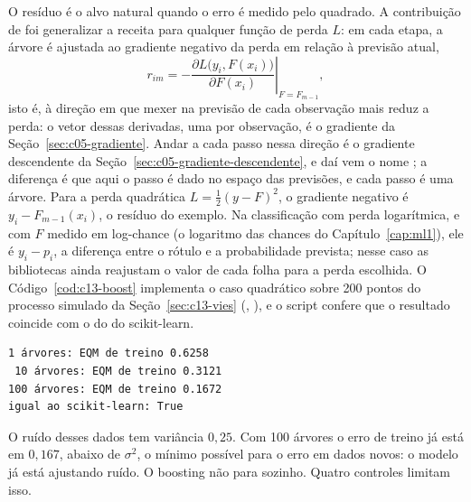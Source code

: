 O resíduo é o alvo natural quando o erro é medido pelo quadrado. A contribuição de \citet{friedman2001} foi generalizar a receita para qualquer função de perda $L$: em cada etapa, a árvore é ajustada ao gradiente negativo da perda em relação à previsão atual,
\begin{equation}
  r_{im} = -\left.\frac{\partial L\big(y_i, F(x_i)\big)}{\partial F(x_i)}\right|_{F = F_{m-1}} ,
\end{equation}
isto é, à direção em que mexer na previsão de cada observação mais reduz a perda: o vetor dessas derivadas, uma por observação, é o gradiente da Seção~\ref{sec:c05-gradiente}. Andar a cada passo nessa direção é o gradiente descendente da Seção~\ref{sec:c05-gradiente-descendente}, e daí vem o nome ; a diferença é que aqui o passo é dado no espaço das previsões, e cada passo é uma árvore. Para a perda quadrática $L = \tfrac{1}{2}(y - F)^2$, o gradiente negativo é $y_i - F_{m-1}(x_i)$, o resíduo do exemplo. Na classificação com perda logarítmica, e com $F$ medido em log-chance (o logaritmo das chances do Capítulo~\ref{cap:ml1}), ele é $y_i - p_i$, a diferença entre o rótulo e a probabilidade prevista; nesse caso as bibliotecas ainda reajustam o valor de cada folha para a perda escolhida. O Código~\ref{cod:c13-boost} implementa o caso quadrático sobre 200 pontos do processo simulado da Seção~\ref{sec:c13-vies} (, ), e o script confere que o resultado coincide com o do  do scikit-learn.


\begin{lstlisting}[style=saida]
  1 árvores: EQM de treino 0.6258
 10 árvores: EQM de treino 0.3121
100 árvores: EQM de treino 0.1672
igual ao scikit-learn: True
\end{lstlisting}

O ruído desses dados tem variância $0,25$. Com 100 árvores o erro de treino já está em $0,167$, abaixo de $\sigma^2$, o mínimo possível para o erro em dados novos: o modelo já está ajustando ruído. O boosting não para sozinho. Quatro controles limitam isso.

